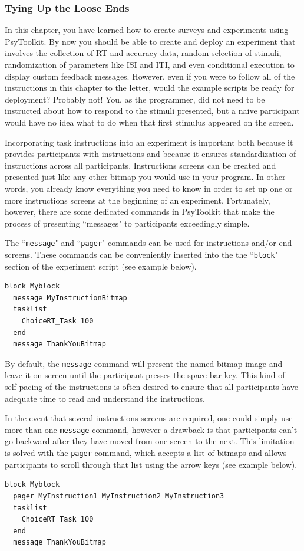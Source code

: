 \subsubsection{Tying Up the Loose Ends}
In this chapter, you have learned how to create surveys and experiments using PsyToolkit.  By now you should be able to create and deploy an experiment that involves the collection of RT and accuracy data, random selection of stimuli, randomization of parameters like ISI and ITI, and even conditional execution to display custom feedback messages.  However, even if you were to follow all of the instructions in this chapter to the letter, would the example scripts be ready for deployment?  Probably not!  You, as the programmer, did not need to be instructed about how to respond to the stimuli presented, but a naive participant would have no idea what to do when that first stimulus appeared on the screen.

Incorporating task instructions into an experiment is important both because it provides participants with instructions and because it ensures standardization of instructions across all participants.  Instructions screens can be created and presented just like any other bitmap you would use in your program.  In other words, you already know everything you need to know in order to set up one or more instructions screens at the beginning of an experiment.  Fortunately, however, there are some dedicated commands in PsyToolkit that make the process of presenting ``messages" to participants exceedingly simple.

The ``\texttt{message}" and ``\texttt{pager}" commands can be used for instructions and/or end screens.  These commands can be conveniently inserted into the the ``\texttt{block}" section of the experiment script (see example below).  
\begin{Verbatim}[xleftmargin=2in]
block Myblock
  message MyInstructionBitmap
  tasklist
    ChoiceRT_Task 100
  end
  message ThankYouBitmap
\end{Verbatim}
By default, the \texttt{message} command will present the named bitmap image and leave it on-screen until the participant presses the space bar key.  This kind of self-pacing of the instructions is often desired to ensure that all participants have adequate time to read and understand the instructions.

In the event that several instructions screens are required, one could simply use more than one \texttt{message} command, however a drawback is that participants can't go backward after they have moved from one screen to the next.  This limitation is solved with the \texttt{pager} command, which accepts a list of bitmaps and allows participants to scroll through that list using the arrow keys (see example below).
\begin{Verbatim}[xleftmargin=2in]
block Myblock
  pager MyInstruction1 MyInstruction2 MyInstruction3
  tasklist
    ChoiceRT_Task 100
  end
  message ThankYouBitmap
\end{Verbatim}

